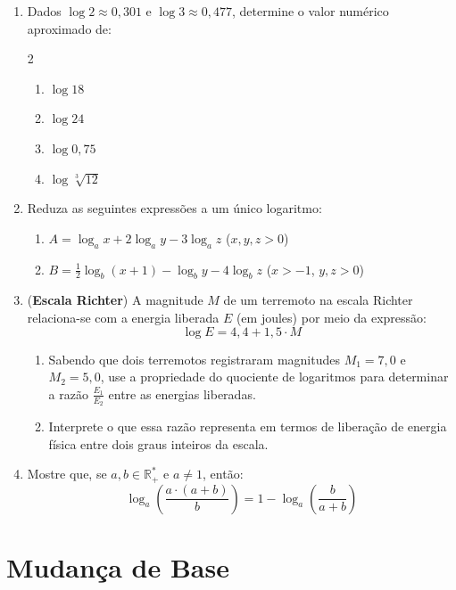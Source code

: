 \documentclass[12pt,a4paper]{report}
\begin{document}
	\begin{enumerate}
		\item Dados $\log 2 \approx 0{,}301$ e $\log 3 \approx 0{,}477$, determine o valor numérico aproximado de:
		\begin{multicols}{2}
			\begin{enumerate}[label=\textbf{\alph*)}]
				\item $\log 18$
				\item $\log 24$
				\item $\log 0{,}75$
				\item $\log \sqrt[3]{12}$
			\end{enumerate}
		\end{multicols}
		
		\item Reduza as seguintes expressões a um único logaritmo:
		\begin{enumerate}[label=\textbf{\alph*)}]
			\item $A = \log_a x + 2\log_a y - 3\log_a z$ \quad ($x, y, z > 0$)
			\item $B = \frac{1}{2}\log_b (x + 1) - \log_b y - 4\log_b z$ \quad ($x > -1$, $y, z > 0$)
		\end{enumerate}
		
		\item (\textbf{Escala Richter}) A magnitude $M$ de um terremoto na escala Richter relaciona-se com a energia liberada $E$ (em joules) por meio da expressão:
		$$\log E = 4{,}4 + 1{,}5 \cdot M$$
		\begin{enumerate}[label=\textbf{\alph*)}]
			\item Sabendo que dois terremotos registraram magnitudes $M_1 = 7{,}0$ e $M_2 = 5{,}0$, use a propriedade do quociente de logaritmos para determinar a razão $\frac{E_1}{E_2}$ entre as energias liberadas.
			\item Interprete o que essa razão representa em termos de liberação de energia física entre dois graus inteiros da escala.
		\end{enumerate}
		
		\item Mostre que, se $a, b \in \mathbb{R}^*_+$ e $a \neq 1$, então:
		$$\log_a \left(\frac{a\cdot (a + b)}{b}\right) = 1 - \log_a \left(\frac{b}{a+b}\right)$$
	\end{enumerate}
	
	\section{Mudança de Base}
	
\end{document}
